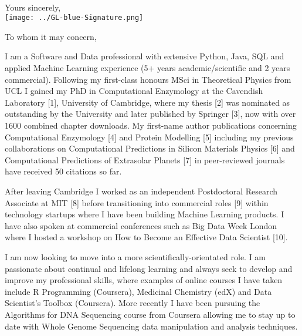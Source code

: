 \documentclass[11pt,a4paper,sans]{moderncv}        %
\begin{document}

\clearpage
\recipient{~}{~}
\date{\vspace*{-0cm}~}
\opening{\vspace*{-3cm}~}
\closing{Yours sincerely, \\ \hspace*{-0.3cm}
\texttt{[image: ../GL-blue-Signature.png]} 
\vspace*{-1cm}
}
\makelettertitle
%
To whom it may concern,
					
I am a Software and Data professional with extensive Python, Java, SQL and applied Machine Learning experience (5+ years academic/scientific and 2 years commercial). Following my first-class honours MSci in Theoretical Physics from UCL I gained my PhD in Computational Enzymology at the Cavendish Laboratory [1], University of Cambridge, where my thesis [2] was nominated as outstanding by the University and later published by Springer [3], now with over 1600 combined chapter downloads. My first-name author publications concerning Computational Enzymology [4] and Protein Modelling [5] including my previous collaborations on Computational Predictions in Silicon Materials Physics [6] and Computational Predictions of Extrasolar Planets [7] in peer-reviewed journals have received 50 citations so far.

After leaving Cambridge I worked as an independent Postdoctoral Research Associate at MIT [8] before transitioning into commercial roles [9] within technology startups where I have been building Machine Learning products. I have also spoken at commercial conferences such as Big Data Week London where I hosted a workshop on How to Become an Effective Data Scientist [10].

I am now looking to move into a more scientifically-orientated role. I am passionate about continual and lifelong learning and always seek to develop and improve my professional skills, where examples of online courses I have taken include R Programming (Coursera), Medicinal Chemistry (edX) and Data Scientist's Toolbox (Coursera). More recently I have been pursuing the 
Algorithms for DNA Sequencing course from Coursera allowing me to stay up to date
with Whole Genome Sequencing data manipulation and analysis techniques.
\end{document}
